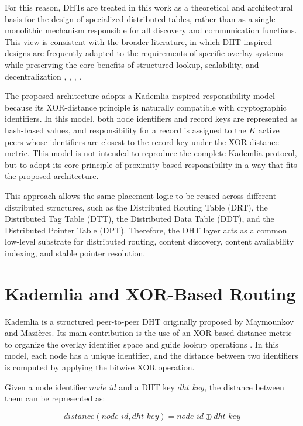 \documentclass[
  12pt,
  oneside,
  a4paper,
  chapter=TITLE,
  section=TITLE,
  english,
  brazil
]{abntex2}
\begin{document}
For this reason, DHTs are treated in this work as a theoretical and architectural
basis for the design of specialized distributed tables, rather than as a single
monolithic mechanism responsible for all discovery and communication functions.
This view is consistent with the broader literature, in which DHT-inspired designs
are frequently adapted to the requirements of specific overlay systems while
preserving the core benefits of structured lookup, scalability, and decentralization
\cite{stoica2001chord}, \cite{maymounkov2002kademlia}, \cite{rowstron2001pastry}, \cite{augustine2022byzantine}.

The proposed architecture adopts a Kademlia-inspired responsibility model because
its XOR-distance principle is naturally compatible with cryptographic identifiers.
In this model, both node identifiers and record keys are represented as hash-based
values, and responsibility for a record is assigned to the \(K\) active peers whose
identifiers are closest to the record key under the XOR distance metric. This model
is not intended to reproduce the complete Kademlia protocol, but to adopt its core
principle of proximity-based responsibility in a way that fits the proposed
architecture.

This approach allows the same placement logic to be reused across different
distributed structures, such as the Distributed Routing Table (DRT), the
Distributed Tag Table (DTT), the Distributed Data Table (DDT), and the Distributed
Pointer Table (DPT). Therefore, the DHT layer acts as a common low-level substrate
for distributed routing, content discovery, content availability indexing, and
stable pointer resolution.

\section{Kademlia and XOR-Based Routing}

Kademlia is a structured peer-to-peer DHT originally proposed by Maymounkov and
Mazi\`eres. Its main contribution is the use of an XOR-based distance metric to
organize the overlay identifier space and guide lookup operations
\cite{maymounkov2002kademlia}. In this model, each node has a unique identifier,
and the distance between two identifiers is computed by applying the bitwise XOR
operation.

Given a node identifier \(node\_id\) and a DHT key \(dht\_key\), the distance between
them can be represented as:

\[
distance(node\_id, dht\_key) = node\_id \oplus dht\_key
\]
\end{document}
